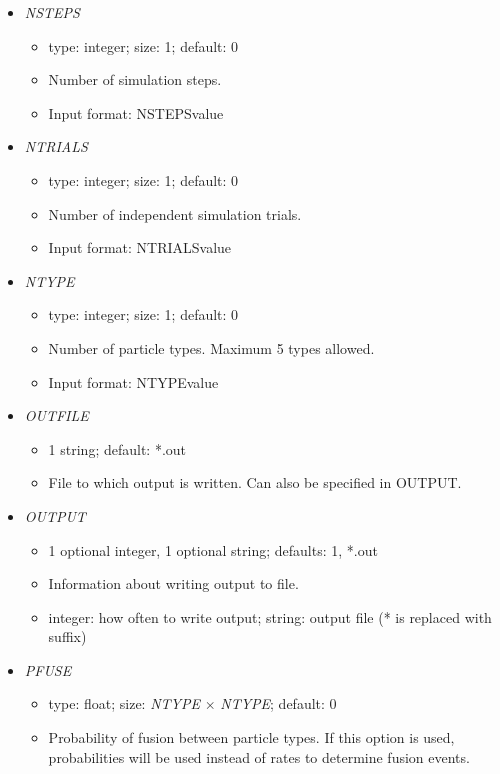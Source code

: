 \documentclass[12pt]{article}
\begin{document}
\begin{itemize}
\begin{itemize}
	\item Number of special regions within the domain.
	\item Input format: NREG\quad value
\end{itemize} 
%
\item {\it NSTEPS}
\begin{itemize}
	\item  type: integer; size: 1; default: 0
	\item Number of simulation steps.
	\item Input format: NSTEPS\quad value
\end{itemize} 
%
\item {\it NTRIALS}
\begin{itemize}
	\item  type: integer; size: 1; default: 0
	\item Number of independent simulation trials.
	\item Input format: NTRIALS\quad value
\end{itemize} 
%
\item {\it NTYPE}
\begin{itemize}
	\item  type: integer; size: 1; default: 0
	\item Number of particle types. Maximum 5 types allowed.
	\item Input format: NTYPE\quad value
\end{itemize}
%
\item {\it OUTFILE}
	\begin{itemize}
		\item 1 string; default: *.out
		\item File to which output is written. Can also be specified in OUTPUT.
	\end{itemize} 
%
\item {\it OUTPUT}
\begin{itemize}
	\item 1 optional integer, 1 optional string; defaults: 1, *.out
	\item Information about writing output to file.
	\item integer: how often to write output; string: output file (* is replaced with suffix)
\end{itemize}
%
\item {\it PFUSE}
\begin{itemize}
	\item  type: float; size: \textit{NTYPE} $\times$ \textit{NTYPE}; default: 0
	\item Probability of fusion between particle types. If this option is used, probabilities will be used instead of rates to determine fusion events.

\end{itemize}
\end{itemize}
\end{document}
